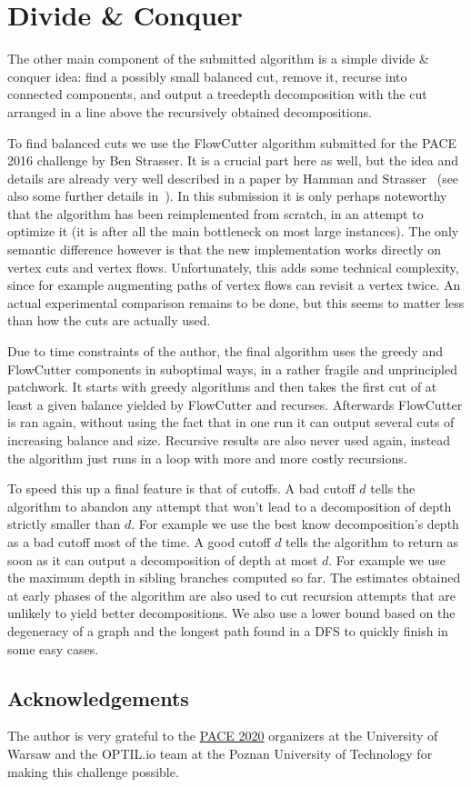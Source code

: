 \documentclass{timgad}
\begin{document}
\section{Divide \& Conquer}
The other main component of the submitted algorithm is a simple divide \& conquer idea: find a possibly small balanced cut, remove it, recurse into connected components, and output a treedepth decomposition with the cut arranged in a line above the recursively obtained decompositions.

To find balanced cuts we use the FlowCutter algorithm submitted for the PACE 2016 challenge by Ben Strasser.
It is a crucial part here as well, but the idea and details are already very well described in a paper by Hamman and Strasser~\cite{HamannS18} (see also some further details in~\cite{Strasser17}).
In this submission it is only perhaps noteworthy that the algorithm has been reimplemented from scratch,
in an attempt to optimize it (it is after all the main bottleneck on most large instances).
The only semantic difference however is that the new implementation works directly on vertex cuts and vertex flows.
Unfortunately, this adds some technical complexity, since for example augmenting paths of vertex flows can revisit a vertex twice.
An actual experimental comparison remains to be done, but this seems to matter less than how the cuts are actually used.

Due to time constraints of the author, the final algorithm uses the greedy and FlowCutter components in suboptimal ways, in a rather fragile and unprincipled patchwork.
It starts with greedy algorithms and then takes the first cut of at least a given balance yielded by FlowCutter and recurses.
Afterwards FlowCutter is ran again, without using the fact that in one run it can output several cuts of increasing balance and size.
Recursive results are also never used again, instead the algorithm just runs in a loop with more and more costly recursions.

To speed this up a final feature is that of cutoffs.
A bad cutoff $d$ tells the algorithm to abandon any attempt that won't lead to a decomposition of depth strictly smaller than $d$.
For example we use the best know decomposition's depth as a bad cutoff most of the time.
A good cutoff $d$ tells the algorithm to return as soon as it can output a decomposition of depth at most $d$.
For example we use the maximum depth in sibling branches computed so far.
The estimates obtained at early phases of the algorithm are also used to cut recursion attempts that are unlikely to yield better decompositions.
We also use a lower bound based on the degeneracy of a graph and the longest path found in a DFS to quickly finish in some easy cases.

\subsection*{Acknowledgements}
The author is very grateful to the \href{https://pacechallenge.org/2020}{PACE 2020} organizers at the University of Warsaw and the OPTIL.io team at the Poznan University of Technology for making this challenge possible.

\pagebreak

\printbibliography
\end{document}
